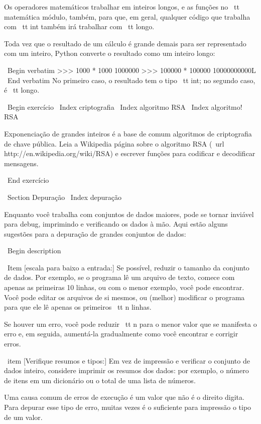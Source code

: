 \documentclass[10pt]{book}
\begin{document}
{{{{{{{Os operadores matemáticos trabalhar em inteiros longos, e as funções
no {\ tt matemática} módulo, também, para que, em geral, qualquer código que
trabalha com {\ tt int} também irá trabalhar com {\ tt longo}.

Toda vez que o resultado de um cálculo é grande demais para ser representado com
um inteiro, Python converte o resultado como um inteiro longo:

\ Begin {verbatim}
>>> 1000 * 1000
1000000
>>> 100000 * 100000
10000000000L
\ End {verbatim}
%
No primeiro caso, o resultado tem o tipo {\ tt int}; no
segundo caso, é {\ tt longo}.

\ Begin {} exercício
\ Index {} criptografia
\ Index {algoritmo RSA}
\ Index {algoritmo! RSA}

Exponenciação de grandes inteiros é a base de comum
algoritmos de criptografia de chave pública. Leia a Wikipedia
página sobre o algoritmo RSA (\ url {http://en.wikipedia.org/wiki/RSA})
e escrever funções para codificar e decodificar mensagens.


\ End {} exercício


\ Section {} Depuração
\ Index {depuração}

Enquanto você trabalha com conjuntos de dados maiores, pode se tornar inviável para
debug, imprimindo e verificando os dados à mão. Aqui estão alguns
sugestões para a depuração de grandes conjuntos de dados:

\ Begin {description}

\ Item [escala para baixo a entrada:] Se possível, reduzir o tamanho da
conjunto de dados. Por exemplo, se o programa lê um arquivo de texto, comece com
apenas as primeiras 10 linhas, ou com o menor exemplo, você pode encontrar.
Você pode editar os arquivos de si mesmos, ou (melhor) modificar o
programa para que ele lê apenas os primeiros {\ tt n} linhas.

Se houver um erro, você pode reduzir {\ tt n} para o menor
valor que se manifesta o erro e, em seguida, aumentá-la gradualmente
como você encontrar e corrigir erros.

\ item [Verifique resumos e tipos:] Em vez de impressão e verificar o
conjunto de dados inteiro, considere imprimir os resumos dos dados: por exemplo,
o número de itens em um dicionário ou o total de uma lista de números.

Uma causa comum de erros de execução é um valor que não é o direito
digita. Para depurar esse tipo de erro, muitas vezes é o suficiente para impressão
o tipo de um valor.

}}}}}}}
\end{document}
